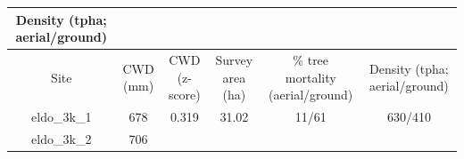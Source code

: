 \documentclass[twoside,12pt,final]{ucthesis-CA2012}
\begin{document}
\begin{ucmainmatter}
\begin{longtable}[]{@{}cccccc@{}}
\begin{minipage}[b]{0.22\columnwidth}
Density (tpha; aerial/ground)\strut
\end{minipage}\tabularnewline
\midrule
\endfirsthead
\toprule
\begin{minipage}[b]{0.11\columnwidth}\centering\strut
Site\strut
\end{minipage} & \begin{minipage}[b]{0.07\columnwidth}\centering\strut
CWD (mm)\strut
\end{minipage} & \begin{minipage}[b]{0.11\columnwidth}\centering\strut
CWD (z-score)\strut
\end{minipage} & \begin{minipage}[b]{0.13\columnwidth}\centering\strut
Survey area (ha)\strut
\end{minipage} & \begin{minipage}[b]{0.18\columnwidth}\centering\strut
\% tree mortality (aerial/ground)\strut
\end{minipage} & \begin{minipage}[b]{0.22\columnwidth}\centering\strut
Density (tpha; aerial/ground)\strut
\end{minipage}\tabularnewline
\midrule
\endhead
\begin{minipage}[t]{0.11\columnwidth}\centering\strut
eldo\_3k\_1\strut
\end{minipage} & \begin{minipage}[t]{0.07\columnwidth}\centering\strut
678\strut
\end{minipage} & \begin{minipage}[t]{0.11\columnwidth}\centering\strut
0.319\strut
\end{minipage} & \begin{minipage}[t]{0.13\columnwidth}\centering\strut
31.02\strut
\end{minipage} & \begin{minipage}[t]{0.18\columnwidth}\centering\strut
11/61\strut
\end{minipage} & \begin{minipage}[t]{0.22\columnwidth}\centering\strut
630/410\strut
\end{minipage}\tabularnewline
\begin{minipage}[t]{0.11\columnwidth}\centering\strut
eldo\_3k\_2\strut
\end{minipage} & \begin{minipage}[t]{0.07\columnwidth}\centering\strut
706\strut
\end{minipage} & \begin{minipage}[t]{0.11\columnwidth}\centering\strut

\end{minipage}
\end{longtable}
\end{ucmainmatter}
\end{document}
